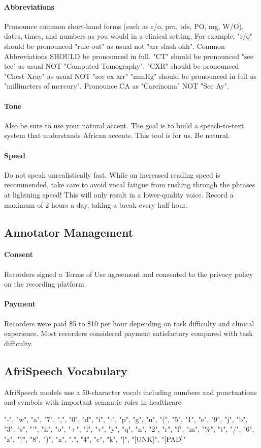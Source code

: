 \documentclass[11pt,a4paper]{article}
\begin{document}
    \paragraph{Abbreviations} Pronounce common short-hand forms (such as r/o, prn, tds, PO, mg, W/O), dates, times, and numbers as you would in a clinical setting. For example, "r/o" should be pronounced "rule out" as usual not "arr slash ohh".  Common Abbreviations SHOULD be pronounced in full. "CT" should be pronounced "see tee" as usual NOT "Computed Tomography". "CXR" should be pronounced "Chest Xray" as usual NOT "see ex arr" "mmHg" should be pronounced in full as "millimeters of mercury". Pronounce CA as "Carcinoma" NOT "See Ay".%
    \paragraph{Tone} Also be sure to use your natural accent. The goal is to build a speech-to-text system that understands African accents. This tool is for us. Be natural.
    \paragraph{Speed} Do not speak unrealistically fast. While an increased reading speed is recommended, take care to avoid vocal fatigue from rushing through the phrases at lightning speed! This will only result in a lower-quality voice. Record a maximum of 2 hours a day, taking a break every half hour.
    
\subsection{Annotator Management}

\paragraph{Consent} Recorders signed a Terms of Use agreement and consented to the privacy policy on the recording platform.

\paragraph{Payment}Recorders were paid \$5 to \$10 per hour depending on task difficulty and clinical experience. Most recorders considered payment satisfactory compared with task difficulty.


\subsection{AfriSpeech Vocabulary}\label{appendix:vocabulary}
AfriSpeech models use a 50-character vocab including numbers and punctuations and symbols with important semantic roles in healthcare.

"-", "w", "a", "7", ",", "0", "d", "i", ":", "p", "g", "u", "(", "5", "1", "e", "9", "j", "b", "3", "s", "'", "h", "o", "+", "l", "v", "y", "q", "n", "2", "r", "f", "m", "\%", "t", "/", "6", "z", "?", "8", ")", "x", ".", "4", "c", "k", "|", "[UNK]", "[PAD]"
\end{document}
